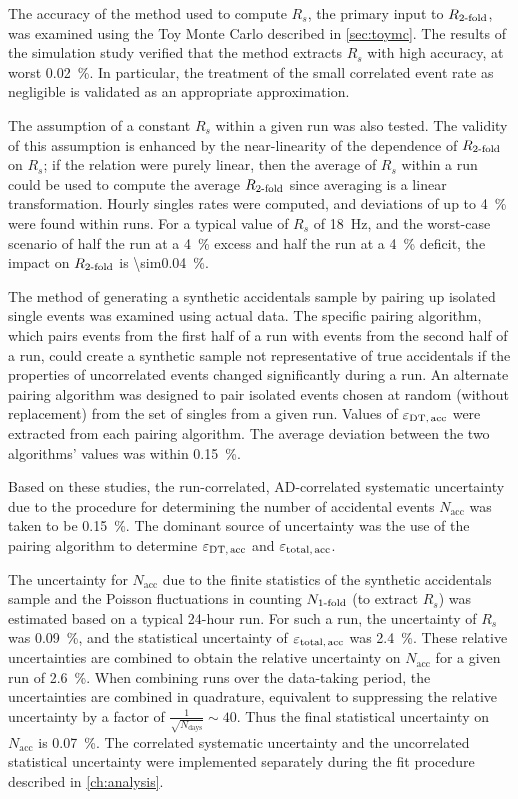The accuracy of the method used to compute $R_{s}$,
the primary input to $R_{\text{\ensuremath{2}-fold}}$,
was examined using the Toy Monte Carlo described in \cref{sec:toymc}.
The results of the simulation study verified that
the method extracts $R_s$ with high accuracy, at worst \SI{0.02}{\percent}.
In particular, the treatment of the small correlated event rate as negligible
is validated as an appropriate approximation.

The assumption of a constant $R_s$ within a given run was also tested.
The validity of this assumption is enhanced by the near-linearity of
the dependence of $R_{\text{\ensuremath{2}-fold}}$ on $R_s$;
if the relation were purely linear,
then the average of $R_s$ within a run could be used to compute
the average $R_{\text{\ensuremath{2}-fold}}$ since averaging is a linear transformation.
Hourly singles rates were computed, and deviations of up to \SI{4}{\percent}
were found within runs.
For a typical value of $R_s$ of \SI{18}{\Hz},
and the worst-case scenario of half the run at a \SI{4}{\percent} excess
and half the run at a \SI{4}{\percent} deficit,
the impact on $R_{\text{\ensuremath{2}-fold}}$ is \SI{\sim0.04}{\percent}.

The method of generating a synthetic accidentals sample
by pairing up isolated single events was examined using actual data.
The specific pairing algorithm, which pairs events from the first half of a run
with events from the second half of a run,
could create a synthetic sample not representative of true accidentals
if the properties of uncorrelated events changed significantly during a run.
An alternate pairing algorithm was designed to pair isolated events
chosen at random (without replacement) from the set of singles from a given run.
Values of $\varepsilon_{\text{DT,\,acc}}$ were extracted from each pairing algorithm.
The average deviation between the two algorithms' values was within \SI{0.15}{\percent}.

Based on these studies, the run-correlated, AD-correlated systematic uncertainty
due to the procedure for determining the number of accidental events $N_{\text{acc}}$
was taken to be \SI{0.15}{\percent}.
The dominant source of uncertainty was the use of the pairing algorithm
to determine $\varepsilon_{\text{DT,\,acc}}$ and $\varepsilon_{\text{total,\,acc}}$.

The uncertainty for $N_{\text{acc}}$ due to the finite statistics
of the synthetic accidentals sample
and the Poisson fluctuations in counting $N_{\text{\ensuremath{1}-fold}}$
(to extract $R_s$)
was estimated based on a typical 24-hour run.
For such a run, the uncertainty of $R_s$ was \SI{0.09}{\percent},
and the statistical uncertainty of $\varepsilon_{\text{total,\,acc}}$
was \SI{2.4}{\percent}.
These relative uncertainties are combined to obtain
the relative uncertainty on $N_{\text{acc}}$ for a given run of \SI{2.6}{\percent}.
When combining runs over the data-taking period,
the uncertainties are combined in quadrature,
equivalent to suppressing the relative uncertainty by a factor of
$\frac{1}{\sqrt{N_{\text{days}}}} \sim 40$.
Thus the final statistical uncertainty on $N_{\text{acc}}$ is \SI{0.07}{\percent}.
The correlated systematic uncertainty and the uncorrelated statistical uncertainty
were implemented separately during the fit procedure described in \cref{ch:analysis}.

